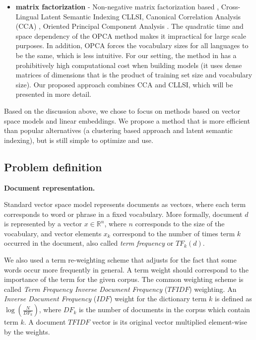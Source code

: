 \documentclass[twoside,11pt]{article}
\newcommand{\RR}{\mathbb{R}}
\begin{document}
\begin{itemize}
\item \textbf{matrix factorization} - Non-negative matrix factorization based \cite{nonnegfactor_lsi}, Cross-Lingual Latent Semantic Indexing CLLSI, Canonical Correlation Analysis (CCA) \cite{Hotelling}, Oriented Principal Component Analysis \cite{platt2010translingual}. The quadratic time and space dependency of the OPCA method makes it impractical for large scale purposes. In addition, OPCA forces the vocabulary sizes for all languages to be the same, which is less intuitive. For our setting, the method in \cite{nonnegfactor_lsi} has a prohibitively high computational cost when building models (it uses dense matrices of dimensions that is the product of training set size and vocabulary size). Our proposed approach combines CCA and CLLSI, which will be presented in more detail.

\end{itemize}

Based on the discussion above, we chose to focus on methods based on vector space models and linear embeddings. We propose a method that is more efficient than popular alternatives (a clustering based approach and latent semantic indexing), but is still simple to optimize and use.

\subsection{Problem definition}
\label{sec:tfidf}
\textbf{Document representation.}

Standard vector space model \cite{Salton88term-weightingapproaches} represents documents as vectors, where each term corresponds to word or phrase in a fixed vocabulary. More formally, document $d$ is represented by a vector $x \in \RR^n$, where $n$ corresponds to the size of the vocabulary, and vector elements $x_k$ correspond to the number of times term $k$ occurred in the document, also called \emph{term frequency} or $TF_k(d)$.

We also used a term re-weighting scheme that adjusts for the fact that some words occur more frequently in general. A term weight should correspond to the importance of the term for the given corpus. The common weighting scheme is called \emph{Term Frequency Inverse Document Frequency} ($TFIDF$) weighting. An \emph{Inverse Document Frequency} ($IDF$) weight for the dictionary term $k$ is defined as $\log\left( \frac{N}{DF_k} \right)$, where $DF_k$ is the number of documents in the corpus which contain term $k$.  A document $TFIDF$ vector is its original vector multiplied element-wise by the weights.
\end{document}
